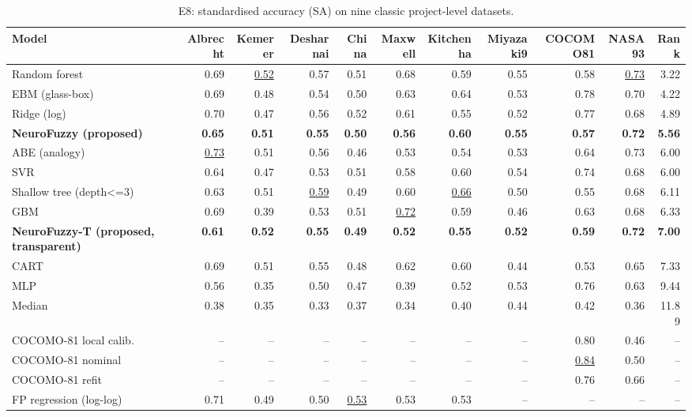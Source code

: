 \begin{table}[t]
\centering
\scriptsize
\caption{E8: standardised accuracy (SA) on nine classic project-level datasets.}
\label{tab:e8}
\begin{tabular}{lrrrrrrrrrr}
\toprule
Model & Albrecht & Kemerer & Desharnai & China & Maxwell & Kitchenha & Miyazaki9 & COCOMO81 & NASA93 & Rank \\
\midrule
Random forest & 0.69 & \underline{0.52} & 0.57 & 0.51 & 0.68 & 0.59 & 0.55 & 0.58 & \underline{0.73} & 3.22 \\
EBM (glass-box) & 0.69 & 0.48 & 0.54 & 0.50 & 0.63 & 0.64 & 0.53 & 0.78 & 0.70 & 4.22 \\
Ridge (log) & 0.70 & 0.47 & 0.56 & 0.52 & 0.61 & 0.55 & 0.52 & 0.77 & 0.68 & 4.89 \\
\textbf{NeuroFuzzy (proposed)} & \textbf{0.65} & \textbf{0.51} & \textbf{0.55} & \textbf{0.50} & \textbf{0.56} & \textbf{0.60} & \textbf{0.55} & \textbf{0.57} & \textbf{0.72} & \textbf{5.56} \\
ABE (analogy) & \underline{0.73} & 0.51 & 0.56 & 0.46 & 0.53 & 0.54 & 0.53 & 0.64 & 0.73 & 6.00 \\
SVR & 0.64 & 0.47 & 0.53 & 0.51 & 0.58 & 0.60 & 0.54 & 0.74 & 0.68 & 6.00 \\
Shallow tree (depth<=3) & 0.63 & 0.51 & \underline{0.59} & 0.49 & 0.60 & \underline{0.66} & 0.50 & 0.55 & 0.68 & 6.11 \\
GBM & 0.69 & 0.39 & 0.53 & 0.51 & \underline{0.72} & 0.59 & 0.46 & 0.63 & 0.68 & 6.33 \\
\textbf{NeuroFuzzy-T (proposed, transparent)} & \textbf{0.61} & \textbf{0.52} & \textbf{0.55} & \textbf{0.49} & \textbf{0.52} & \textbf{0.55} & \textbf{0.52} & \textbf{0.59} & \textbf{0.72} & \textbf{7.00} \\
CART & 0.69 & 0.51 & 0.55 & 0.48 & 0.62 & 0.60 & 0.44 & 0.53 & 0.65 & 7.33 \\
MLP & 0.56 & 0.35 & 0.50 & 0.47 & 0.39 & 0.52 & 0.53 & 0.76 & 0.63 & 9.44 \\
Median & 0.38 & 0.35 & 0.33 & 0.37 & 0.34 & 0.40 & 0.44 & 0.42 & 0.36 & 11.89 \\
COCOMO-81 local calib. & -- & -- & -- & -- & -- & -- & -- & 0.80 & 0.46 & -- \\
COCOMO-81 nominal & -- & -- & -- & -- & -- & -- & -- & \underline{0.84} & 0.50 & -- \\
COCOMO-81 refit & -- & -- & -- & -- & -- & -- & -- & 0.76 & 0.66 & -- \\
FP regression (log-log) & 0.71 & 0.49 & 0.50 & \underline{0.53} & 0.53 & 0.53 & -- & -- & -- & -- \\

\end{tabular}
\end{table}
